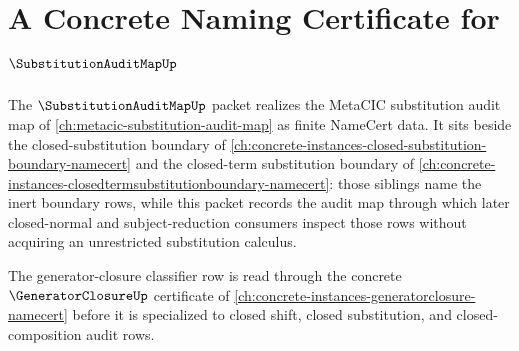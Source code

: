 \chapter{A Concrete Naming Certificate for $\SubstitutionAuditMapUp$}
\label{ch:concrete-instances-substitutionauditmap-namecert}

The $\SubstitutionAuditMapUp$ packet realizes the MetaCIC substitution audit map of \autoref{ch:metacic-substitution-audit-map} as finite NameCert data. It sits beside the closed-substitution boundary of \autoref{ch:concrete-instances-closed-substitution-boundary-namecert} and the closed-term substitution boundary of \autoref{ch:concrete-instances-closedtermsubstitutionboundary-namecert}: those siblings name the inert boundary rows, while this packet records the audit map through which later closed-normal and subject-reduction consumers inspect those rows without acquiring an unrestricted substitution calculus.

The generator-closure classifier row is read through the concrete $\GeneratorClosureUp$ certificate of \autoref{ch:concrete-instances-generatorclosure-namecert} before it is specialized to closed shift, closed substitution, and closed-composition audit rows.

